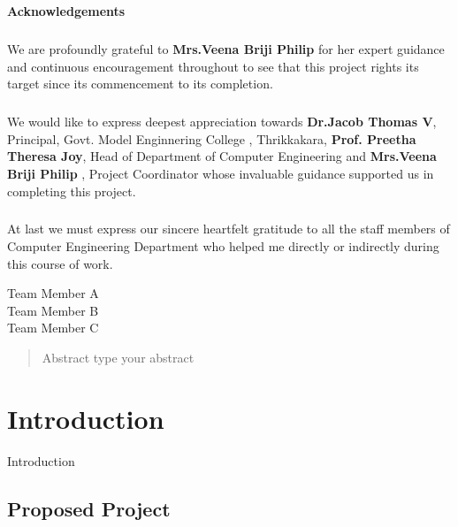 \documentclass[11pt]{report}
\begin{document}
\begin{center}
	\thispagestyle{empty}
	\LARGE{\textbf{Acknowledgements}}\\[1cm]
\end{center}
\linespread{1.13}
\large{\paragraph{}We are profoundly grateful to \textbf{Mrs.Veena Briji Philip } for her expert guidance
	and continuous encouragement throughout to see that this project rights its
	target since its commencement to its completion.}
\large{\paragraph{}We would like to express deepest appreciation towards \textbf{Dr.Jacob Thomas V},
	Principal, Govt. Model Enginnering College , Thrikkakara, \textbf{Prof. Preetha Theresa Joy}, 
	Head of Department of Computer Engineering and \textbf{Mrs.Veena Briji Philip }, Project Coordinator whose
	invaluable guidance supported us in completing this project.}
\large{\paragraph{}At last we must express our sincere heartfelt gratitude to all the staff members
	of Computer Engineering Department who helped me directly or indirectly during this course of work.}
\begin{flushright}
	{
		Team Member A\\
		Team Member B\\
		Team Member C
	}
\end{flushright}
\newpage
 
\begin{abstract}
Abstract
type your abstract
\end{abstract}

\tableofcontents





\chapter {Introduction}
\label{intro}
Introduction

\section{Proposed Project}
\end{document}
